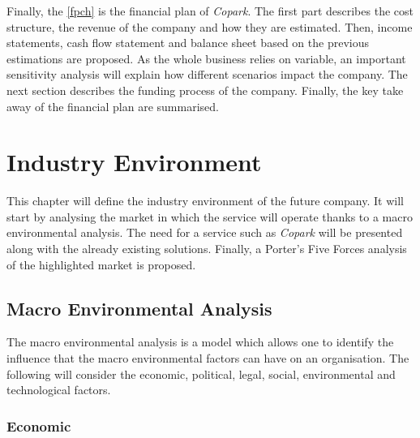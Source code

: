 \documentclass[12pt,a4paper,oneside]{book}
\newcommand{\bp}{\textit{Copark}}
\begin{document}
Finally, the \autoref{fpch} is the financial plan of \bp{}. The first part describes the cost structure, the revenue of the company and how they are estimated. Then, income statements, cash flow statement and balance sheet based on the previous estimations are proposed. As the whole business relies on variable, an important sensitivity analysis will explain how different scenarios impact the company. The next section describes the funding process of the company. Finally, the key take away of the financial plan are summarised.

\chapter{Industry Environment}
\label{iechap}

This chapter will define the industry environment of the future company. It will start by analysing the market in which the service will operate thanks to a macro environmental analysis. The need for a service such as \bp{} will be presented along with the already existing solutions. Finally, a Porter's Five Forces analysis of the highlighted market is proposed.\\

\section{Macro Environmental Analysis}

The macro environmental analysis is a model which allows one to identify the influence that the macro environmental factors can have on an organisation. The following will consider the economic, political, legal, social, environmental and technological factors.

\subsection{Economic}

\end{document}

